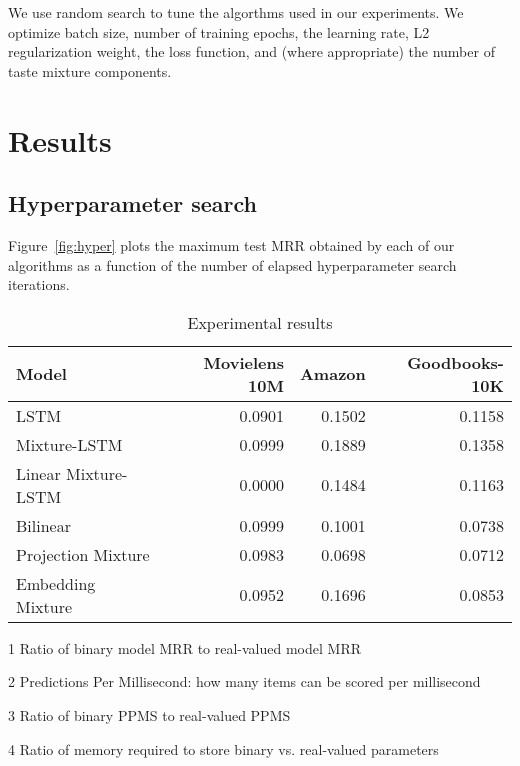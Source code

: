 \documentclass[sigconf]{acmart}
\begin{document}
We use random search to tune the algorthms used in our experiments. We optimize batch size, number of training epochs, the learning rate, L2 regularization weight, the loss function, and (where appropriate) the number of taste mixture components.

\section{Results}

\subsection{Hyperparameter search}
Figure~\ref{fig:hyper} plots the maximum test MRR obtained by each of our algorithms as a function of the number of elapsed hyperparameter search iterations.

\begin{table}[htbp]
\begin{threeparttable}
\caption{Experimental results}
\label{tb:results}
\begin{tabular}{lrrr}
\toprule
 Model               &   Movielens 10M &   Amazon &   Goodbooks-10K \\
\midrule
 LSTM                &          0.0901 &   0.1502 &          0.1158 \\
 Mixture-LSTM        &          0.0999 &   0.1889 &          0.1358 \\
 Linear Mixture-LSTM &          0.0000 &   0.1484 &          0.1163 \\
 \midrule
 Bilinear            &          0.0999 &   0.1001 &          0.0738 \\
 Projection Mixture  &          0.0983 &   0.0698 &          0.0712 \\
 Embedding Mixture   &          0.0952 &   0.1696 &          0.0853 \\
\bottomrule
\end{tabular}
\begin{tablenotes}
\small{
\item[1] Ratio of binary model MRR to real-valued model MRR
\item[2] Predictions Per Millisecond: how many items can be scored per millisecond
\item[3] Ratio of binary PPMS to real-valued PPMS
\item[4] Ratio of memory required to store binary vs. real-valued parameters
}
\end{tablenotes}
\end{threeparttable}
\end{table}
\end{document}
